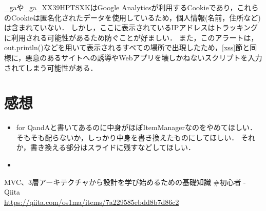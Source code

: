 \documentclass[titlepage,a4paper]{jsarticle}
\begin{document}
\_gaや\_ga\_XX39HPTSXKはGoogle Analyticsが利用するCookieであり，これらのCookieは匿名化されたデータを使用しているため，個人情報(名前，住所など)は含まれていない．
しかし，ここに表示されているIPアドレスはトラッキングに利用される可能性があるため防ぐことが好ましい．
また，このアラートは，out.println()などを用いて表示されるすべての場所で出現したため，\ref{xss}節と同様に，悪意のあるサイトへの誘導やWebアプリを壊しかねないスクリプトを入力されてしまう可能性がある．
\section{感想}
\begin{itemize}
  \item for QandAと書いてあるのに中身がほぼItemManagerなのをやめてほしい．
        そもそも配らないか，しっかり中身を書き換えたものにしてほしい．
        それか，書き換える部分はスライドに残すなどしてほしい．
  \item 
\end{itemize}

\begin{thebibliography}{99}
  MVC、3層アーキテクチャから設計を学び始めるための基礎知識 \#初心者 - Qiita\\\url{https://qiita.com/os1ma/items/7a229585ebdd8b7d86c2}
\end{thebibliography}
\end{document}
